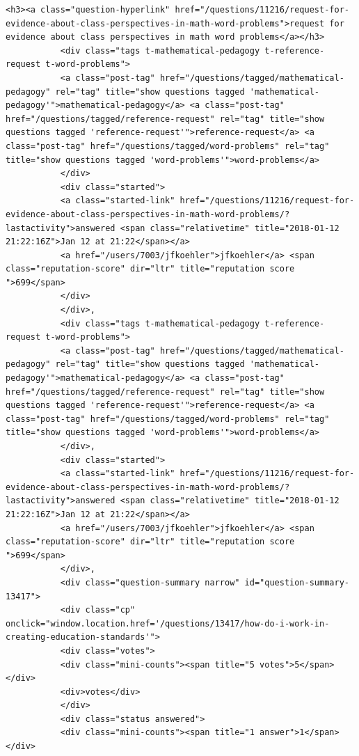 \documentclass[11pt]{article}
\begin{document}
\begin{Verbatim}[commandchars=\\\{\}]
           <h3><a class="question-hyperlink" href="/questions/11216/request-for-evidence-about-class-perspectives-in-math-word-problems">request for evidence about class perspectives in math word problems</a></h3>
           <div class="tags t-mathematical-pedagogy t-reference-request t-word-problems">
           <a class="post-tag" href="/questions/tagged/mathematical-pedagogy" rel="tag" title="show questions tagged 'mathematical-pedagogy'">mathematical-pedagogy</a> <a class="post-tag" href="/questions/tagged/reference-request" rel="tag" title="show questions tagged 'reference-request'">reference-request</a> <a class="post-tag" href="/questions/tagged/word-problems" rel="tag" title="show questions tagged 'word-problems'">word-problems</a>
           </div>
           <div class="started">
           <a class="started-link" href="/questions/11216/request-for-evidence-about-class-perspectives-in-math-word-problems/?lastactivity">answered <span class="relativetime" title="2018-01-12 21:22:16Z">Jan 12 at 21:22</span></a>
           <a href="/users/7003/jfkoehler">jfkoehler</a> <span class="reputation-score" dir="ltr" title="reputation score ">699</span>
           </div>
           </div>,
           <div class="tags t-mathematical-pedagogy t-reference-request t-word-problems">
           <a class="post-tag" href="/questions/tagged/mathematical-pedagogy" rel="tag" title="show questions tagged 'mathematical-pedagogy'">mathematical-pedagogy</a> <a class="post-tag" href="/questions/tagged/reference-request" rel="tag" title="show questions tagged 'reference-request'">reference-request</a> <a class="post-tag" href="/questions/tagged/word-problems" rel="tag" title="show questions tagged 'word-problems'">word-problems</a>
           </div>,
           <div class="started">
           <a class="started-link" href="/questions/11216/request-for-evidence-about-class-perspectives-in-math-word-problems/?lastactivity">answered <span class="relativetime" title="2018-01-12 21:22:16Z">Jan 12 at 21:22</span></a>
           <a href="/users/7003/jfkoehler">jfkoehler</a> <span class="reputation-score" dir="ltr" title="reputation score ">699</span>
           </div>,
           <div class="question-summary narrow" id="question-summary-13417">
           <div class="cp" onclick="window.location.href='/questions/13417/how-do-i-work-in-creating-education-standards'">
           <div class="votes">
           <div class="mini-counts"><span title="5 votes">5</span></div>
           <div>votes</div>
           </div>
           <div class="status answered">
           <div class="mini-counts"><span title="1 answer">1</span></div>

\end{Verbatim}
\end{document}
